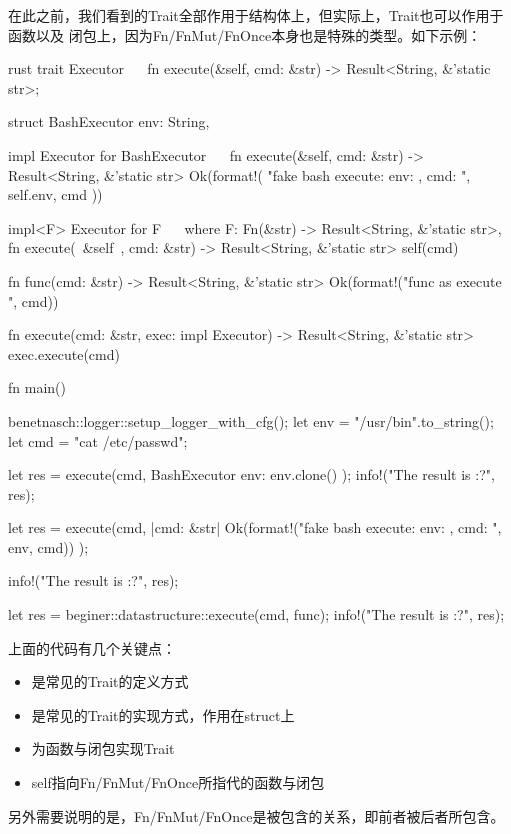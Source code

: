 在此之前，我们看到的Trait全部作用于结构体上，但实际上，Trait也可以作用于函数以及
闭包上，因为Fn/FnMut/FnOnce本身也是特殊的类型。如下示例：
\begin{code-block}[escapeinside=~~, mathescape]{rust}
trait Executor { ~~
    fn execute(&self, cmd: &str) -> Result<String, &'static str>;
}

struct BashExecutor {
    env: String,
}

impl Executor for BashExecutor { ~~
    fn execute(&self, cmd: &str) -> Result<String, &'static str> {
        Ok(format!(
            "fake bash execute: env: {}, cmd: {}",
            self.env, cmd
        ))
    }
}

impl<F> Executor for F ~~
where
    F: Fn(&str) -> Result<String, &'static str>,
{
    fn execute(~\colorbox{WildStrawberry}{&self}~, cmd: &str) -> Result<String, &'static str> {
        self(cmd)
    }
}

fn func(cmd: &str) -> Result<String, &'static str> {
    Ok(format!("func as execute {}", cmd))
}

fn execute(cmd: &str, exec: impl Executor) -> Result<String, &'static str> {
    exec.execute(cmd)
}

fn main() {
    benetnasch::logger::setup_logger_with_cfg();
    let env = "/usr/bin".to_string();
    let cmd = "cat /etc/passwd";

    let res = execute(cmd, BashExecutor { env: env.clone() });
    info!("The result is {:?}", res);

    let res = execute(cmd, |cmd: &str| {
        Ok(format!("fake bash execute: env: {}, cmd: {}", env, cmd))
    });

    info!("The result is {:?}", res);

    let res = beginer::datastructure::execute(cmd, func);
    info!("The result is {:?}", res);
}
\end{code-block}

上面的代码有几个关键点：
\begin{itemize}
  \renewcommand\labelitemi{\leftpointright}
  \item {} 是常见的Trait的定义方式
  \item {} 是常见的Trait的实现方式，作用在struct上
  \item {} 为函数与闭包实现Trait
  \item {} self指向Fn/FnMut/FnOnce所指代的函数与闭包
\end{itemize}
另外需要说明的是，Fn/FnMut/FnOnce是被包含的关系，即前者被后者所包含。


